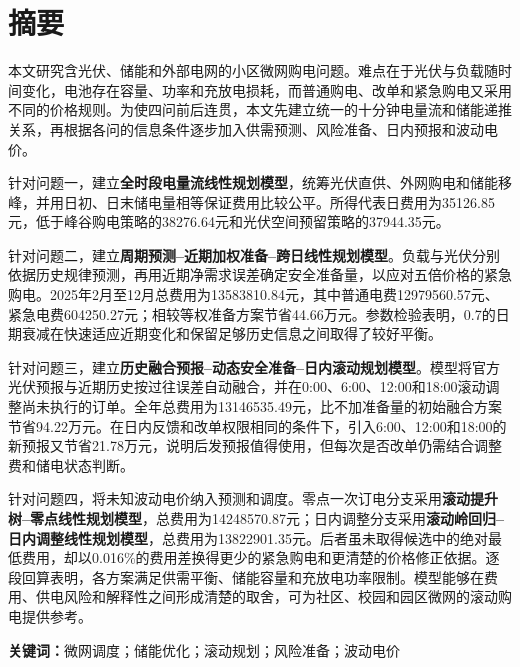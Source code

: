 \section*{摘\quad 要}

本文研究含光伏、储能和外部电网的小区微网购电问题。难点在于光伏与负载随时间变化，电池存在容量、功率和充放电损耗，而普通购电、改单和紧急购电又采用不同的价格规则。为使四问前后连贯，本文先建立统一的十分钟电量流和储能递推关系，再根据各问的信息条件逐步加入供需预测、风险准备、日内预报和波动电价。

针对问题一，建立\textbf{全时段电量流线性规划模型}，统筹光伏直供、外网购电和储能移峰，并用日初、日末储电量相等保证费用比较公平。所得代表日费用为35126.85元，低于峰谷购电策略的38276.64元和光伏空间预留策略的37944.35元。

针对问题二，建立\textbf{周期预测--近期加权准备--跨日线性规划模型}。负载与光伏分别依据历史规律预测，再用近期净需求误差确定安全准备量，以应对五倍价格的紧急购电。2025年2月至12月总费用为13583810.84元，其中普通电费12979560.57元、紧急电费604250.27元；相较等权准备方案节省44.66万元。参数检验表明，0.7的日期衰减在快速适应近期变化和保留足够历史信息之间取得了较好平衡。

针对问题三，建立\textbf{历史融合预报--动态安全准备--日内滚动规划模型}。模型将官方光伏预报与近期历史按过往误差自动融合，并在0:00、6:00、12:00和18:00滚动调整尚未执行的订单。全年总费用为13146535.49元，比不加准备量的初始融合方案节省94.22万元。在日内反馈和改单权限相同的条件下，引入6:00、12:00和18:00的新预报又节省21.78万元，说明后发预报值得使用，但每次是否改单仍需结合调整费和储电状态判断。

针对问题四，将未知波动电价纳入预测和调度。零点一次订电分支采用\textbf{滚动提升树--零点线性规划模型}，总费用为14248570.87元；日内调整分支采用\textbf{滚动岭回归--日内调整线性规划模型}，总费用为13822901.35元。后者虽未取得候选中的绝对最低费用，却以0.016\%的费用差换得更少的紧急购电和更清楚的价格修正依据。逐段回算表明，各方案满足供需平衡、储能容量和充放电功率限制。模型能够在费用、供电风险和解释性之间形成清楚的取舍，可为社区、校园和园区微网的滚动购电提供参考。

\noindent\textbf{关键词：}微网调度；储能优化；滚动规划；风险准备；波动电价

